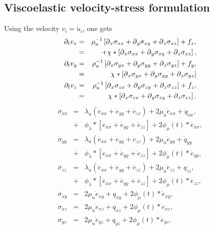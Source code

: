 \documentclass[11pt]{article}
\begin{document}
\subsection*{Viscoelastic velocity-stress formulation} 
Using the velocity $v_i = \dot{u}_i$, one gets
\begin{eqnarray}
  \partial_t{v}_x & = & \rho^{-1}_u\left[\mbox{$\partial$}_x \sigma_{xx} +\mbox{$\partial$}_y \sigma_{xy} 
                                    +\mbox{$\partial$}_z \sigma_{xz}\right] + f_x, \nonumber\\
            & = & + \chi*\left[\mbox{$\partial$}_x \sigma_{xx} +\mbox{$\partial$}_y \sigma_{xy} 
                                    +\mbox{$\partial$}_z \sigma_{xz}\right],       \nonumber\\
  \partial_t{v}_y & = & \rho^{-1}_u\left[\mbox{$\partial$}_x \sigma_{yx} +\mbox{$\partial$}_y \sigma_{yy} 
                                    +\mbox{$\partial$}_z \sigma_{yz}\right] + f_y, \nonumber\\
            & = & \chi*\left[\mbox{$\partial$}_x \sigma_{yx} +\mbox{$\partial$}_y \sigma_{yy} 
                                    +\mbox{$\partial$}_z \sigma_{yz}\right]        \nonumber\\
  \partial_t{v}_z & = & \rho^{-1}_u\left[\mbox{$\partial$}_x \sigma_{zx} +\mbox{$\partial$}_y \sigma_{zy} 
                                    +\mbox{$\partial$}_z \sigma_{zz}\right] + f_z, \nonumber\\
            & = & \chi*\left[\mbox{$\partial$}_x \sigma_{zx} +\mbox{$\partial$}_y \sigma_{zy} 
                                    +\mbox{$\partial$}_z \sigma_{zz}\right].
\end{eqnarray}
\begin{eqnarray}
  \dot{\sigma}_{xx} 
     & = & \lambda_u \left (\dot{e}_{xx} 
                 + \dot{e}_{yy} + \dot{e}_{zz}\right)
                 + 2\mu_u \dot{e}_{xx} +\dot{q}_{xx},          \nonumber\\ 
     & + & \phi_{\lambda}*[\dot{e}_{xx}+\dot{e}_{yy}
                 +\dot{e}_{zz}] + 2\phi_{\mu}(t)*\dot{e}_{xx}, \nonumber\\
  \dot{\sigma}_{yy} 
     & = & \lambda_u \left (\dot{e}_{xx} 
                 +\dot{e}_{yy} + \dot{e}_{zz}\right)
                 + 2\mu_u \dot{e}_{yy} +\dot{q}_{yy}           \nonumber\\
     & + & \phi_{\lambda}*[\dot{e}_{xx}+\dot{e}_{yy}
                 +\dot{e}_{zz}] + 2\phi_{\mu}(t)*\dot{e}_{yy}, \nonumber\\
  \dot{\sigma}_{zz} 
    & = & \lambda_u \left (\dot{e}_{xx} 
                + \dot{e}_{yy} + \dot{e}_{zz}\right)
                + 2\mu_u \dot{e}_{zz} +q_{zz},                 \nonumber\\
    & + & \phi_{\lambda}*[\dot{e}_{xx}
                +\dot{e}_{yy}+\dot{e}_{zz}] 
                + 2\phi_{\mu}(t)*\dot{e}_{zz},                 \nonumber\\
  \dot{\sigma}_{xy} 
   & = & 2\mu_u \dot{e}_{xy} +q_{xy} 
                + 2\phi_{\mu}(t)*\dot{e}_{xy},                 \nonumber\\
  \dot{\sigma}_{xz} 
   & = & 2\mu_u \dot{e}_{xz} +q_{xz} 
                + 2\phi_{\mu}(t)*\dot{e}_{xz},                 \nonumber\\
  \dot{\sigma}_{yz} 
   & = & 2\mu_u \dot{e}_{yz} +q_{yz}
               +  2\phi_{\mu}(t)*\dot{e}_{yz}.                 \nonumber\\
\end{eqnarray}
\end{document}
